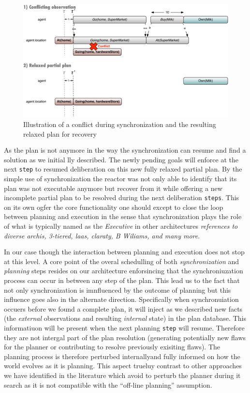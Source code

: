 \begin{figure}[!htbp]
  \centering
  \includegraphics[width=0.7\columnwidth]{figs/shoping_exec_relax}  
  \caption{Illustration of a conflict during synchronization and the
    resulting relaxed plan for recovery} 
  \label{fig:shop:relax}
\end{figure}

As the plan is not anymore in the way the synchronization can resume
and find a solution as we initial lly described. The newly pending
goals will enforce at the next \texttt{step} to resumed deliberation
on this new fully relaxed partial plan. By the simple use of
synchronization the reactor was not only able to identify that its
plan was not executable anymore but recover from it while offering a
new incomplete partial plan to be resolved during the next
deliberation \texttt{steps}. This on its own ogfer the core
functionality one should except to close the loop between planning and
execution in the sense that synchronization plays the role of what is
typically named as the {\em Executive} in other architectures
{\em\color{red} references to diverse archis, 3-tiered, laas, claraty,
  B Wiliams, and many more}.

In our case though the interaction between planning and execution does
not stop at this level. A core point of the overal schedulling of both
{\em synchronization} and {\em planning} steps resides on our
architecture enforsincing that the synchroniuzation process can occur
in between any step of the plan. This lead us to the fact that not
only synchronization is imnfluenced by the outcome of planning but
this influence goes also in the alternate direction. Specifically when
synchronuiation occuers before we found a complete plan, it will
inject as we described new facts (the {\em external} observations and
resulting {\em internal} state) in the plan database. This
informatiuon will be present when the next planning \texttt{step} will
resume. Therefore they are not intergal part of the plan resolution
(generating potentially new flaws for the planner or contributing to
resolve previously exisiting flaws). The planning process is therefore
perturbed internallyand fully informed on how the world evolves as it
is planning.  This aspect trueluy contrast to other approaches we have
identified in the literature which avoid to perturb the planner during
it search as it is not compatible with the ``off-line planning''
assumption.

